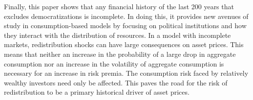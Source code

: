 Finally, this paper shows that any financial history of the last 200 years that excludes democratizations is incomplete.  In doing this, it provides new avenues of study in consumption-based models by focusing on political institutions and how they interact with the distribution of resources. In a model with incomplete markets, redistribution shocks can have large consequences on asset prices. This means that neither an increase in the probability of a large drop in aggregate consumption nor an increase in the volatility of aggregate consumption is necessary for an increase in risk premia. The consumption risk faced by relatively wealthy investors need only be affected. This paves the road for the risk of redistribution to be a primary historical driver of asset prices.
